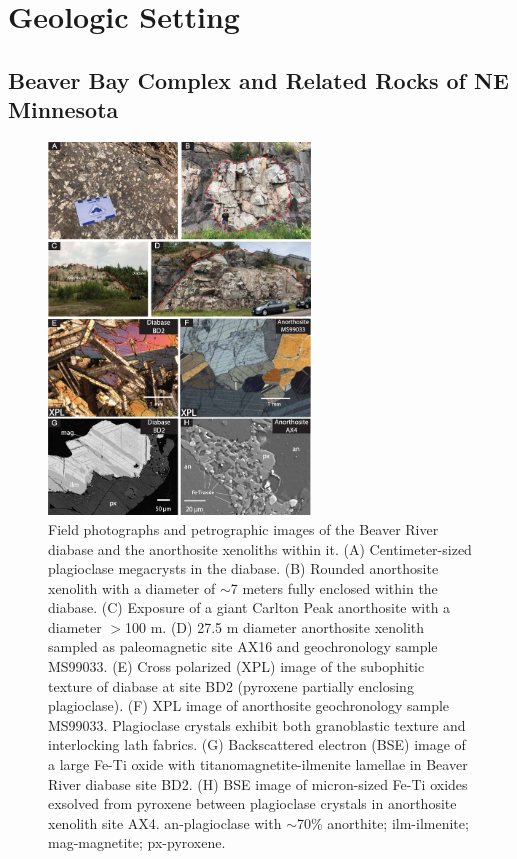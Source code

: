 \section{Geologic Setting}

\subsection{Beaver Bay Complex and Related Rocks of NE Minnesota}

\begin{figure}[h!]
\centering
\noindent\includegraphics[width=0.62\textwidth]{figure/Zhang2021/Field_photo.pdf}
\caption[Field photographs and petrographic images of the Beaver River diabase and the anorthosite xenoliths]{\footnotesize{Field photographs and petrographic images of the Beaver River diabase and the anorthosite xenoliths within it. (A) Centimeter-sized plagioclase megacrysts in the diabase. (B) Rounded anorthosite xenolith with a diameter of $\sim$7 meters fully enclosed within the diabase. (C) Exposure of a giant Carlton Peak anorthosite with a diameter $>$100 m. (D) 27.5 m diameter anorthosite xenolith sampled as paleomagnetic site AX16 and geochronology sample MS99033. (E) Cross polarized (XPL) image of the subophitic texture of diabase at site BD2 (pyroxene partially enclosing plagioclase). (F) XPL image of anorthosite geochronology sample MS99033. Plagioclase crystals exhibit both granoblastic texture and interlocking lath fabrics. (G) Backscattered electron (BSE) image of a large Fe-Ti oxide with titanomagnetite-ilmenite lamellae in Beaver River diabase site BD2. (H) BSE image of micron-sized Fe-Ti oxides exsolved from pyroxene between plagioclase crystals in anorthosite xenolith site AX4. an-plagioclase with $\sim$70\% anorthite; ilm-ilmenite; mag-magnetite; px-pyroxene.}}
\label{fig:Chap_BBC_Field_photo}
\end{figure}

